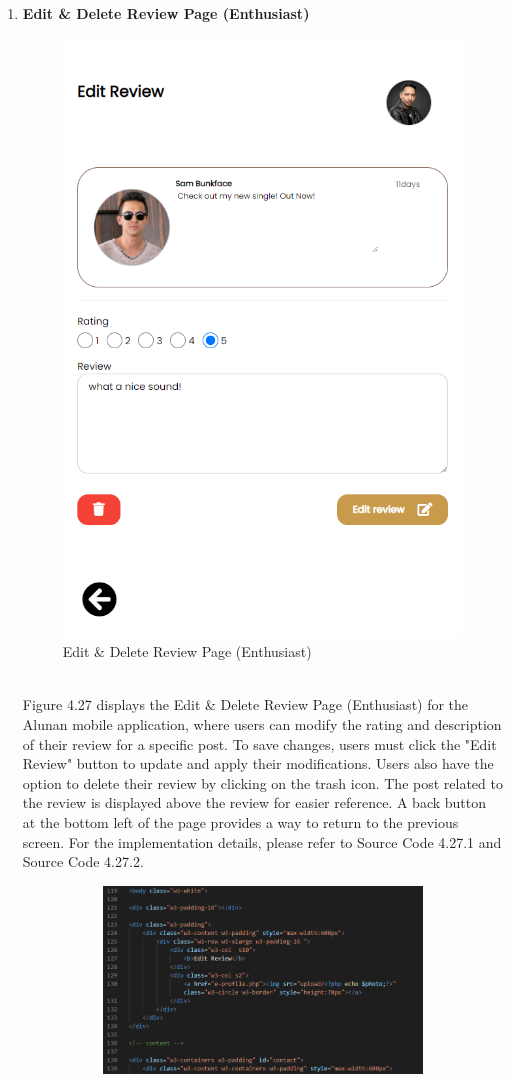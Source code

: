 \begin{enumerate}[1.]
    \item \textbf{Edit \& Delete Review Page (Enthusiast)}
    \begin{figure}[h]
        \centering
        \includegraphics[width=0.5\linewidth]{mainmatter/images/frontend/ss/Edit-Delete Review (Enthusiast).png}
        \caption{Edit \& Delete Review Page (Enthusiast)}
        \label{fig:myfig66}
    \end{figure} \\
    Figure 4.27 displays the Edit \& Delete Review Page (Enthusiast) for the Alunan mobile application, where users can modify the rating and description of their review for a specific post. To save changes, users must click the "Edit Review" button to update and apply their modifications. Users also have the option to delete their review by clicking on the trash icon. The post related to the review is displayed above the review for easier reference. A back button at the bottom left of the page provides a way to return to the previous screen. For the implementation details, please refer to Source Code 4.27.1 and Source Code 4.27.2.
    \clearpage
    \begin{figure}[h]\ContinuedFloat
        \centering
        \begin{subfigure}[b]{0.7\textwidth}
            \centering
            \includegraphics[width=\textwidth]{mainmatter/images/frontend/code/eeditereview.png}

\end{subfigure}
\end{figure}
\end{enumerate}
